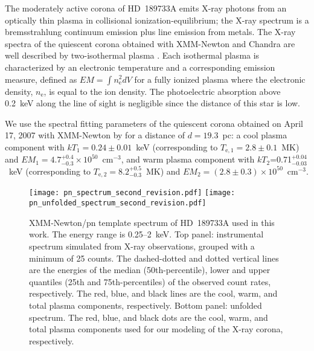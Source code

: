 \documentclass[iop]{emulateapj}
\begin{document}
The moderately active corona of HD~189733A emits X-ray photons from an optically thin plasma in collisional ionization-equilibrium; 
the X-ray spectrum is a bremsstrahlung continuum emission plus line emission from metals. The X-ray spectra of the quiescent 
corona obtained with XMM-Newton and Chandra are well described by two-isothermal plasma 
\citep{Pillitteri2010,Pillitteri2011,Pillitteri2014,Poppenhaeger2013}. Each isothermal plasma is characterized by an electronic 
temperature and a corresponding emission measure, defined as $EM=\int n_\mathrm{e}^2 dV$ for a fully ionized plasma where the
electronic density, $n_\mathrm{e}$, is equal to the ion density. The photoelectric absorption above 0.2~keV along the line of sight 
is negligible since the distance of this star is low. 

We use the spectral fitting parameters of the quiescent corona obtained on April 17, 2007 with XMM-Newton by \cite{Pillitteri2011}
for a distance of $d=19.3$~pc: a cool plasma component with $kT_1=0.24\pm0.01$~keV (corresponding to $T_\mathrm{e,1}=2.8\pm0.1$~MK) 
and $EM_1=4.7_{-0.3}^{+0.4}\times10^{50}$~cm$^{-3}$, and warm plasma component with $kT_2$=0.71$_{-0.03}^{+0.04}$~keV (corresponding 
to $T_\mathrm{e,2}=8.2_{-0.3}^{+0.5}$~MK) and $EM_2=(2.8\pm0.3)\times10^{50}$~cm$^{-3}$.

\begin{figure}[!t]
  \centering
  \texttt{[image: pn\_spectrum\_second\_revision.pdf]} 
  \texttt{[image: pn\_unfolded\_spectrum\_second\_revision.pdf]} 
  \caption{XMM-Newton/pn template spectrum of HD~189733A 
	  used in this work. The energy range is 0.25--2~keV. 
	  Top panel: instrumental spectrum 
	  simulated from X-ray observations, grouped 
	  with a minimum of 25 counts. The dashed-dotted and 
	  dotted vertical lines are the energies of the median 
	  (50th-percentile), lower and upper quantiles (25th 
	  and 75th-percentiles) of the observed count rates, 
	  respectively. The red, blue, and black lines are the 
	  cool, warm, and total plasma components, respectively. 
	  Bottom panel: unfolded spectrum. The red, blue, 
	  and black dots are the cool, warm, and total plasma 
	  components used for our modeling of the X-ray corona, 
	  respectively.}
  \label{Fig:pn_spectrum} 
\end{figure}
\end{document}
